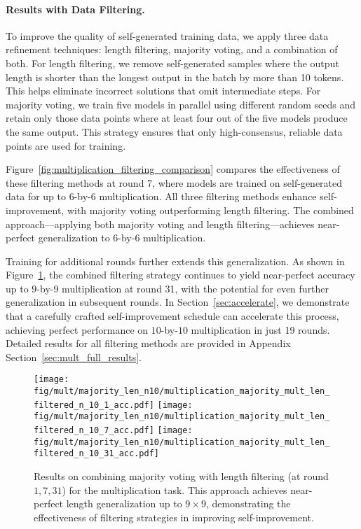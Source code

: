 \paragraph{Results with Data Filtering. }
To improve the quality of self-generated training data, we apply three data refinement techniques: length filtering, majority voting, and a combination of both. For length filtering, we remove self-generated samples where the output length is shorter than the longest output in the batch by more than 10 tokens. This helps eliminate incorrect solutions that omit intermediate steps. For majority voting, we train five models in parallel using different random seeds and retain only those data points where at least four out of the five models produce the same output. This strategy ensures that only high-consensus, reliable data points are used for training.

Figure~\ref{fig:multiplication_filtering_comparison} compares the effectiveness of these filtering methods at round 7, where models are trained on self-generated data for up to $6$-by-$6$ multiplication. All three filtering methods enhance self-improvement, with majority voting outperforming length filtering. The combined approach—applying both majority voting and length filtering—achieves near-perfect generalization to $6$-by-$6$ multiplication.

Training for additional rounds further extends this generalization. As shown in Figure~\ref{fig:multiplication_mv_len_n10}, the combined filtering strategy continues to yield near-perfect accuracy up to $9$-by-$9$ multiplication at round 31, with the potential for even further generalization in subsequent rounds. In Section~\ref{sec:accelerate}, we demonstrate that a carefully crafted self-improvement schedule can accelerate this process, achieving perfect performance on $10$-by-$10$ multiplication in just 19 rounds. Detailed results for all filtering methods are provided in Appendix Section~\ref{sec:mult_full_results}.






\begin{figure}
    \centering
    \texttt{[image: fig/mult/majority\_len\_n10/multiplication\_majority\_mult\_len\_filtered\_n\_10\_1\_acc.pdf]}
    \texttt{[image: fig/mult/majority\_len\_n10/multiplication\_majority\_mult\_len\_filtered\_n\_10\_7\_acc.pdf]}
    \texttt{[image: fig/mult/majority\_len\_n10/multiplication\_majority\_mult\_len\_filtered\_n\_10\_31\_acc.pdf]}
    \caption{Results on combining majority voting with length filtering (at round $1,7,31$) for the multiplication task.
    This approach achieves near-perfect length generalization up to $9 \times 9$, demonstrating the effectiveness of filtering strategies in improving self-improvement.}
    \label{fig:multiplication_mv_len_n10}
    \vspace{-3mm}
\end{figure}



